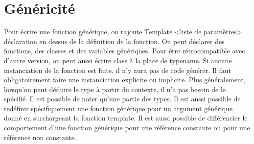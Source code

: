 \documentclass{article}
\begin{document}
\section{Généricité}
Pour écrire une fonction générique, on rajoute Template <liste de paramètres> déclaration en dessus de la définition de la fonction. On peut déclarer des fonctions, des classes et des variables génériques. Pour être rétrocompatible avec d'autre version, on peut aussi écrire class à la place de typename. Si aucune instanciation de la fonction est faite, il n'y aura pas de code générer. Il faut obligatoirement faire une instanciation explicite ou implicite.  
Plus généralement, lorsqu'on peut déduire le type à partir du contexte, il n'a pas besoin de le spécifié. Il est possible de noter qu'une partie des types. Il est aussi possible de redéfinir spécifiquement une fonction générique pour un argument générique donné en surchargeant la fonction template. Il est aussi possible de différencier le comportement d'une fonction générique pour une référence constante ou pour une référence non constante. 
\end{document}
